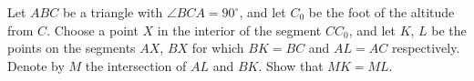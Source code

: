 Let $ABC$ be a triangle with $\angle BCA = 90^{\circ}$, and let $C_0$ be the foot of the altitude from $C$. Choose a point $X$ in the interior of the segment $CC_0$, and let $K$, $L$ be the points on the segments $AX$, $BX$ for which $BK = BC$ and $AL = AC$ respectively. Denote by $M$ the intersection of $AL$ and $BK$. Show that $MK = ML$.
